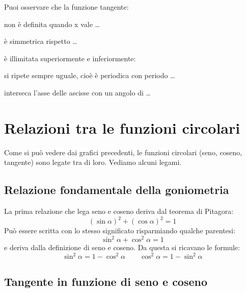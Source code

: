 \vspace{-6pt}
  \begin{center}
\begin{inaccessibleblock}
    
\end{inaccessibleblock}
  \end{center}
   \vspace{-24pt}

\newpage %

Puoi osservare che la funzione tangente:
\begin{itemize*}
 \item non è definita quando x vale \dots
 \item è simmetrica rispetto \dots
 \item è illimitata superiormente e inferiormente:
 \item si ripete sempre uguale, cioè è periodica con periodo \dots
 \item interseca l'asse delle ascisse con un angolo di \dots
\end{itemize*}

\section{Relazioni tra le funzioni circolari}
\label{sec:gonio_relazioni}

Come si può vedere dai grafici precedenti, le funzioni circolari (seno, 
coseno, 
tangente) sono legate tra di loro. Vediamo alcuni legami.

\subsection{Relazione fondamentale della goniometria}

La prima relazione che lega seno e coseno deriva dal teorema di Pitagora:
\[\left(\sin \alpha \right)^2 + \left(\cos \alpha \right)^2 = 1\]
Può essere scritta con lo stesso significato risparmiando qualche parentesi:
\[\sin^2 \alpha + \cos^2 \alpha = 1\]
e deriva dalla definizione di seno e coseno.
Da questa si ricavano le formule:
\[\sin^2 \alpha = 1 - \cos^2 \alpha \qquad 
  \cos^2 \alpha = 1 - \sin^2 \alpha\]

\subsection{Tangente in funzione di seno e coseno}

